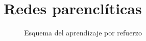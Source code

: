 \chapter{Redes parenclíticas}

\begin{figure}[htbp!]
	\label{fig:redesparencliticas}
	\begin{center}
		\resizebox{\textwidth}{!}{%
			\redesparencliticas
		}
	\end{center}
	\caption{Esquema del aprendizaje por refuerzo}
\end{figure}